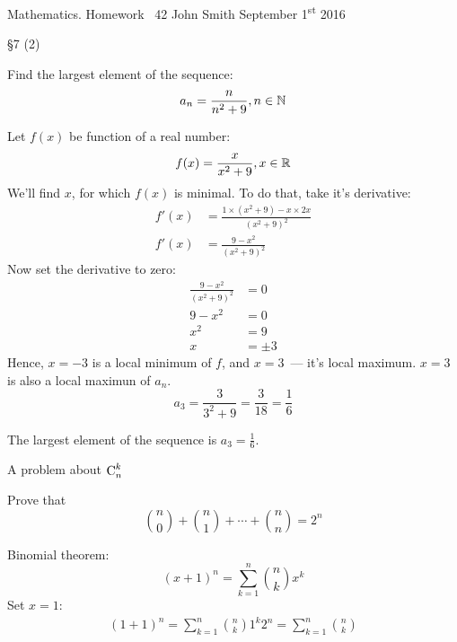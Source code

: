 \documentclass[12pt,a4paper,oneside]{article}
\begin{document}
\homework
{Mathematics. Homework \No~42}%
{John Smith}%
{September 1\textsuperscript{st} 2016}%

\begin{definitions}
\DefineNaturalNumberSet
\DefineNaturalNumberSetWithIndex
\DefineNChooseK
\end{definitions}

\begin{problem}{\S7  (2)}

\Statement
Find the largest element of the sequence:
\begin{equation}
a_n = \frac n {n^2+9}, n \in \mathbb N
\end{equation}

\Solution
Let $f(x)$ be function of a real number:
$$
f(x) = \frac x {x^2+9}, x \in \mathbb R
$$
We'll find $x$, for which $f(x)$ is minimal. To do that, take it's derivative:
\begin{align*}
f'(x) &= \frac{1\times(x^2+9)-x\times2x}{(x^2+9)^2} \\
f'(x) &= \frac{9-x^2}{(x^2+9)^2}
\end{align*}
Now set the derivative to zero:
\begin{align*}
\frac{9-x^2}{(x^2+9)^2} &= 0 \\
9-x^2 &= 0 \\
x^2 &= 9 \\
x &= \pm 3
\end{align*}
Hence, $x = -3$ is a local minimum of $f$, and $x = 3$~--- it's local maximum.
$x = 3$ is also a local maximun of $a_n$.
$$
a_3 = \frac 3 {3^2+9} = \frac 3 {18} = \frac 1 6
$$

\Answer
The largest element of the sequence is $a_3 = \frac 1 6$.

\end{problem}
\begin{problem}{A problem about $\operatorname{C}_n^k$}

\Statement
Prove that
$$
{n \choose 0} + {n \choose 1} + \cdots + {n \choose n} = 2^n
$$

\Proof
Binomial theorem:
$$
(x+1)^n = \sum_{k=1}^n {n \choose k} x^k
$$
Set $x = 1$:
\begin{align*}
(1+1)^n = \sum_{k=1}^n {n \choose k} 1^k
2^n = \sum_{k=1}^n {n \choose k}
\end{align*}
\QED

\end{problem}
\end{document}
